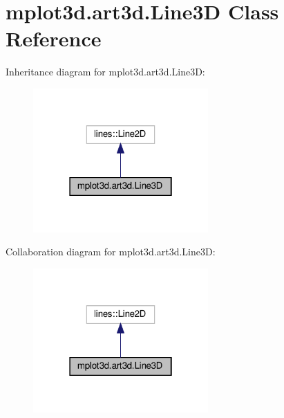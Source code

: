 \hypertarget{classmplot3d_1_1art3d_1_1Line3D}{}\section{mplot3d.\+art3d.\+Line3D Class Reference}
\label{classmplot3d_1_1art3d_1_1Line3D}


Inheritance diagram for mplot3d.\+art3d.\+Line3D\+:
\nopagebreak
\begin{figure}[H]
\begin{center}
\leavevmode
\includegraphics[width=190pt]{classmplot3d_1_1art3d_1_1Line3D__inherit__graph}
\end{center}
\end{figure}


Collaboration diagram for mplot3d.\+art3d.\+Line3D\+:
\nopagebreak
\begin{figure}[H]
\begin{center}
\leavevmode
\includegraphics[width=190pt]{classmplot3d_1_1art3d_1_1Line3D__coll__graph}
\end{center}
\end{figure}

